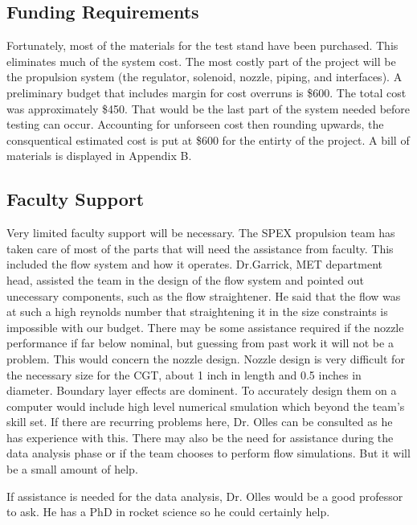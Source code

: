 \documentclass[conference]{IEEEtran} %
\begin{document}
\subsection{Funding Requirements}
Fortunately, most of the materials for the test stand have been purchased. This eliminates much of the system cost. The most costly part of the project
will be the propulsion system (the regulator, solenoid, nozzle, piping, and interfaces). A preliminary budget that includes margin for cost overruns is \$600.
The total cost was approximately \$450. That would be the last part of the system needed before testing can occur. Accounting for unforseen cost then rounding upwards,
the consquentical estimated cost is put at \$600 for the entirty of the project. A bill of materials is displayed in Appendix B.

\subsection{Faculty Support}
Very limited faculty support will be necessary. The SPEX propulsion team has taken care of most of the parts that will need the assistance from faculty.
This included the flow system and how it operates. Dr.Garrick, MET department head, assisted the team in the design of the flow system and pointed out unecessary components, such
as the flow straightener. He said that the flow was at such a high reynolds number that straightening it in the size constraints is impossible with our budget.
There may be some assistance required if the nozzle performance if far below nominal, but guessing from past work it will not be a problem. This would concern the nozzle design.
Nozzle design is very difficult for the necessary size for the CGT, about 1 inch in length and 0.5 inches in diameter. Boundary layer effects are dominent. To accurately design them
on a computer would include high level numerical smulation which beyond the team's skill set. If there are recurring problems here, Dr. Olles can be consulted as he has experience with this.
There may also be the need for assistance during the data analysis phase or if the team chooses to perform flow simulations. But it will be a small amount of help.

If assistance is needed for the data analysis, Dr. Olles would be a good professor to ask. He has a PhD in rocket science
so he could certainly help.
\end{document}
